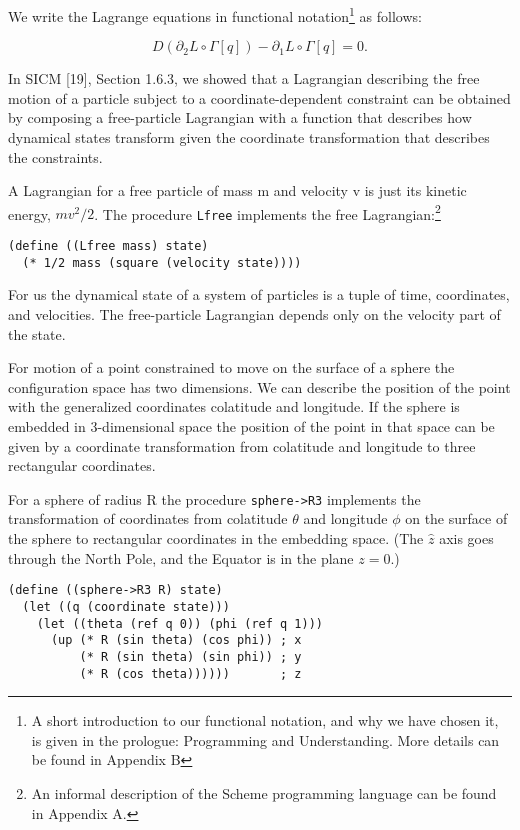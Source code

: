 \documentclass[11pt]{article}
\begin{document}
We write the Lagrange equations in functional notation\footnote{A short introduction to our functional notation, and why we have chosen
it, is given in the prologue: Programming and Understanding. More details can be
found in Appendix B} as follows:

$$
D\left(\partial_{2} L \circ \Gamma[q]\right) - \partial_{1} L \circ \Gamma[q]=0.
$$

In SICM [19], Section 1.6.3, we showed that a Lagrangian describing the free
motion of a particle subject to a coordinate-dependent constraint can be
obtained by composing a free-particle Lagrangian with a function that describes
how dynamical states transform given the coordinate transformation that
describes the constraints.

A Lagrangian for a free particle of mass m and velocity v is just its kinetic
energy, \(mv^2/2\). The procedure \texttt{Lfree} implements the free Lagrangian:\footnote{An informal description of the Scheme programming language can be found
in Appendix A.}

\begin{verbatim}
(define ((Lfree mass) state)
  (* 1/2 mass (square (velocity state))))
\end{verbatim}

For us the dynamical state of a system of particles is a tuple of time,
coordinates, and velocities. The free-particle Lagrangian depends only on the
velocity part of the state.

For motion of a point constrained to move on the surface of a sphere the
configuration space has two dimensions. We can describe the position of the
point with the generalized coordinates colatitude and longitude. If the sphere
is embedded in 3-dimensional space the position of the point in that space can
be given by a coordinate transformation from colatitude and longitude to three
rectangular coordinates.

For a sphere of radius R the procedure \texttt{sphere->R3} implements the
transformation of coordinates from colatitude \(\theta\) and longitude \(\phi\) on
the surface of the sphere to rectangular coordinates in the embedding space.
(The \(\hat{z}\) axis goes through the North Pole, and the Equator is in the plane
\(z = 0\).)

\begin{verbatim}
(define ((sphere->R3 R) state)
  (let ((q (coordinate state)))
    (let ((theta (ref q 0)) (phi (ref q 1)))
      (up (* R (sin theta) (cos phi)) ; x
          (* R (sin theta) (sin phi)) ; y
          (* R (cos theta))))))       ; z
\end{verbatim}
\end{document}
